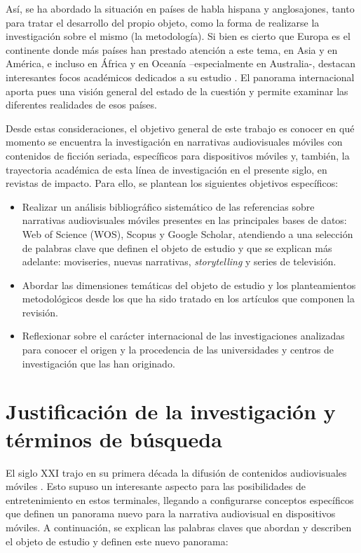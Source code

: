 \documentclass[spanish]{textolivre}
\begin{document}
Así, se ha abordado la situación en países de habla hispana y anglosajones, tanto para tratar el desarrollo del propio objeto, como la forma de realizarse la investigación sobre el mismo (la metodología). Si bien es cierto que Europa es el continente donde más países han prestado atención a este tema, en Asia y en América, e incluso en África y en Oceanía –especialmente en Australia-, destacan interesantes focos académicos dedicados a su estudio \cite{shim2017, dawson2012, goggin2012}. El panorama internacional aporta pues una visión general del estado de la cuestión y permite examinar las diferentes realidades de esos países. 

Desde estas consideraciones, el objetivo general de este trabajo es conocer en qué momento se encuentra la investigación en narrativas audiovisuales móviles con contenidos de ficción seriada, específicos para dispositivos móviles y, también, la trayectoria académica de esta línea de investigación en el presente siglo, en revistas de impacto. Para ello, se plantean los siguientes objetivos específicos: 

\begin{itemize}
\item Realizar un análisis bibliográfico sistemático de las referencias sobre narrativas audiovisuales móviles presentes en las principales bases de datos: Web of Science (WOS), Scopus y Google Scholar, atendiendo a una selección de palabras clave que definen el objeto de estudio y que se explican más adelante: moviseries, nuevas narrativas, \emph{storytelling} y series de televisión.
\item Abordar las dimensiones temáticas del objeto de estudio y los planteamientos metodológicos desde los que ha sido tratado en los artículos que componen la revisión. 
\item Reflexionar sobre el carácter internacional de las investigaciones analizadas para conocer el origen y la procedencia de las universidades y centros de investigación que las han originado. 
\end{itemize}

\section{Justificación de la investigación y términos de búsqueda}
El siglo XXI trajo en su primera década la difusión de contenidos audiovisuales móviles \cite{gomez2007, urban2007, jumiskopyykko2008}. Esto supuso un interesante aspecto para las posibilidades de entretenimiento en estos terminales, llegando a configurarse conceptos específicos que definen un panorama nuevo para la narrativa audiovisual en dispositivos móviles. A continuación, se explican las palabras claves que abordan y describen el objeto de estudio y definen este nuevo panorama: 
\end{document}
